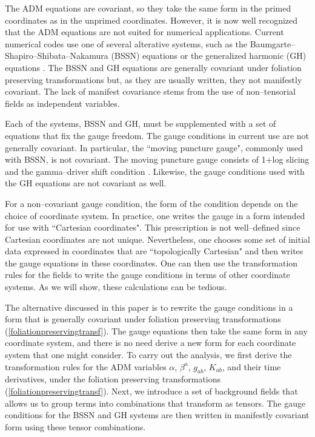 The ADM equations are covariant, so they take the same form in the primed coordinates as in the unprimed coordinates. However, it is now 
well recognized that the ADM equations 
are not suited for numerical applications. Current numerical codes use one of several alterative systems, such as the 
Baumgarte--Shapiro--Shibata--Nakamura (BSSN) equations \cite{Shibata:1995we,Baumgarte:1998te} or the generalized harmonic (GH) 
equations \cite{Friedrich:1985,Garfinkle:2001ni}.
The BSSN and GH equations are generally covariant under foliation preserving transformations but, as they are usually written, 
they not manifestly covariant. The lack of manifest covariance stems from the use of non--tensorial fields as independent variables. 

Each of the systems, BSSN and GH, must be supplemented with a set of equations that fix the gauge freedom. 
The gauge conditions in current use are not generally covariant. In particular, the ``moving puncture gauge", commonly used with BSSN, is not covariant. 
The moving puncture gauge consists of 1+log slicing \cite{Bona:1994dr} and the
gamma--driver shift condition \cite{Alcubierre:2002kk}.  Likewise, the gauge conditions used 
with the GH equations \cite{Pretorius:2006tp,Szilagyi:2009qz, Lindblom:2009tu} are not covariant as well.  

For a non--covariant gauge condition, the form of the condition depends on the choice of coordinate system. 
In practice, one writes the gauge  in a form intended for use with ``Cartesian coordinates". This prescription is not  well--defined 
since Cartesian coordinates are not unique. Nevertheless, one chooses some set of initial data expressed in coordinates that are ``topologically Cartesian"  
and then writes the gauge equations in these coordinates.  One can then use the transformation rules for the fields to write the gauge conditions in terms of 
other coordinate systems. As we will show, these calculations can be tedious. 

The alternative discussed in this paper is to rewrite the gauge conditions in a form that is generally covariant under foliation preserving 
transformations (\ref{foliationpreservingtransf}). The gauge equations then take the same form in any coordinate system, and there is no need derive a new form 
for each coordinate system that one might consider. To carry out the analysis, we first derive the transformation rules for the ADM variables $\alpha$, $\beta^a$, 
$g_{ab}$, $K_{ab}$, and their time derivatives, under the foliation preserving transformations (\ref{foliationpreservingtransf}). Next, we introduce a 
set of background fields that allows us to group terms into combinations that transform as tensors. The gauge conditions for the BSSN and GH systems are 
then written in manifestly covariant form using these tensor combinations. 

